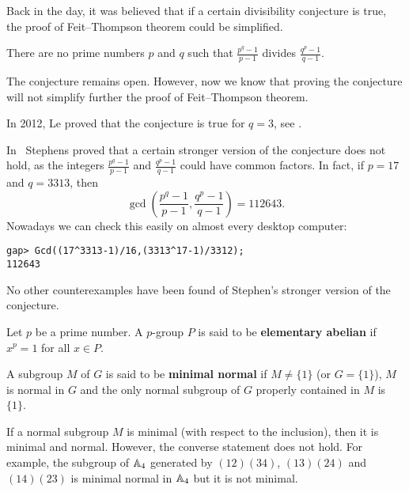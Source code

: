 Back in the day, it was believed that if a certain divisibility 
conjecture is true, 
the proof of Feit--Thompson theorem 
could be simplified. 

\begin{conjecture}
    There are no prime numbers $p$ and $q$ such that
    $\frac {p^{q}-1}{p-1}$ divides $\frac{q^{p} - 1}{q - 1}$. 
\end{conjecture}

The conjecture remains open. However, now we know that 
proving the conjecture will not simplify further
the proof of Feit--Thompson theorem. 

In 2012, Le proved that the conjecture is true for $q=3$, see 
\cite{MR2900154}. 

In~\cite{MR297686} 
Stephens proved that a certain stronger version of the conjecture 
does not hold, as the integers 
$\frac {p^{q}-1}{p-1}$ and $\frac{q^{p} - 1}{q - 1}$ 
could have common factors. In fact, if $p=17$ and $q=3313$, 
then 
\[
\gcd\left(\frac {p^{q}-1}{p-1},\frac{q^{p} - 1}{q - 1}\right)=112643.
\]
Nowadays we can check this easily on almost every desktop computer:
\begin{lstlisting}
gap> Gcd((17^3313-1)/16,(3313^17-1)/3312);
112643
\end{lstlisting}
No other counterexamples have been found of Stephen’s 
stronger version of the conjecture.

\begin{definition}
Let $p$ be a prime number. A $p$-group $P$ is said to be 
\textbf{elementary abelian} if $x^p=1$ for all $x\in P$.
\end{definition}

\begin{definition}
A subgroup $M$ of $G$ is said to be \textbf{minimal normal} if $M\ne\{1\}$
(or $G = \{1\}$),
$M$ is normal in $G$ and the only normal 
subgroup of $G$ properly contained in $M$ is $\{1\}$. 
\end{definition}

\begin{example}
    If a normal subgroup $M$ is minimal (with respect to the inclusion), 
    then it is minimal and normal. However, 
    the converse statement does not hold. For example, the subgroup
    of $\mathbb{A}_4$ generated by $(12)(34)$, $(13)(24)$ and $(14)(23)$ is minimal normal in $\mathbb{A}_4$ 
    but it is not minimal. 
\end{example}

